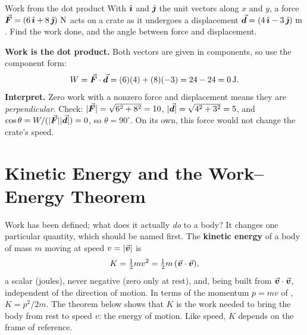 \begin{exbox}{Work from the dot product}
With $\hat{\bm{\imath}}$ and $\hat{\bm{\jmath}}$ the unit vectors along $x$ and $y$,
a force $\vF=(6\,\uhat{\imath}+8\,\uhat{\jmath})\ \si{N}$ acts on a crate as it undergoes a displacement
$\vc{d}=(4\,\uhat{\imath}-3\,\uhat{\jmath})\ \si{m}$. Find the work done, and the angle between force and
displacement.

 \textbf{Work is the dot product.} Both vectors are given in components, so use the component form:
\[
W=\vec{\bm{F}}\cdot\vec{\bm{d}}=(6)(4)+(8)(-3)=24-24=\SI{0}{J}.
\]
 \textbf{Interpret.} Zero work with a nonzero force and displacement means they are
\emph{perpendicular}. Check: $|\vec{\bm{F}}|=\sqrt{6^2+8^2}=10$, $|\vec{\bm{d}}|=\sqrt{4^2+3^2}=5$, and
$\cos\theta=W/(|\vec{\bm{F}}||\vec{\bm{d}}|)=0$, so $\theta=90^\circ$. On its own, this force would not change the
crate's speed.
\end{exbox}

\section{Kinetic Energy and the Work--Energy Theorem}

Work has been defined; what does it actually \emph{do} to a body? It changes one particular quantity,
which should be named first. The \textbf{kinetic energy} of a body of mass $m$
moving at speed $v=|\vec{\bm{v}}|$ is
\[
K=\tfrac12 m v^2=\tfrac12 m\,(\vec{\bm{v}}\cdot\vec{\bm{v}}),
\]
a scalar (joules), never negative (zero only at rest), and, being built from $\vec{\bm{v}}\cdot\vec{\bm{v}}$, independent of the
direction of motion. In terms of the momentum $p=mv$ of , $K=p^2/2m$. The theorem below
shows that $K$ is the work needed to bring the body from rest to speed $v$: the energy of motion. Like
speed, $K$ depends on the frame of reference.

